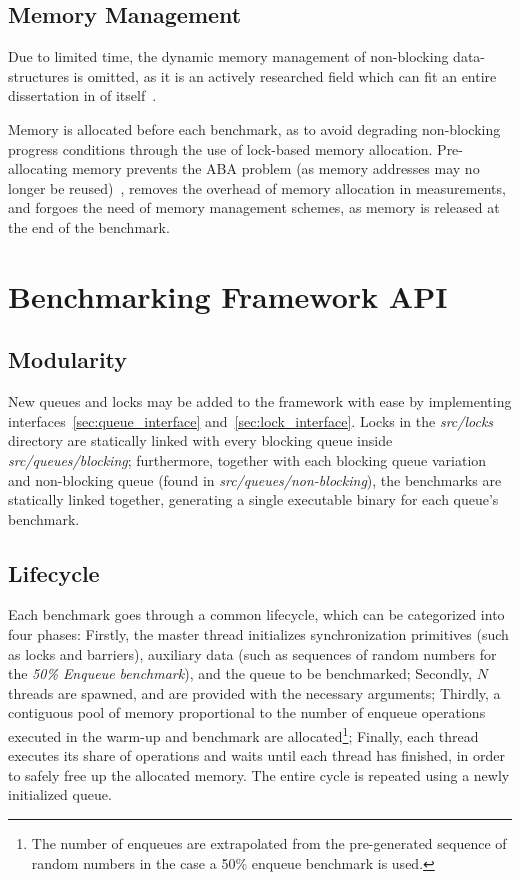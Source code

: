 \subsection{Memory Management}
Due to limited time, the dynamic memory management of non-blocking
data-structures is omitted, as it is an actively researched field which can fit
an entire dissertation in of itself~\citep{valois1995datastructures,michael2004hazard}.

Memory is allocated before each benchmark, as to avoid degrading
non-blocking progress conditions through the use of lock-based memory
allocation. Pre-allocating memory prevents the ABA problem (as memory addresses
may no longer be reused)~\citep{dechev2010understanding}, removes the overhead
of memory allocation in measurements, and forgoes the need of memory management
schemes, as memory is released at the end of the benchmark.

\section{Benchmarking Framework API}
\subsection{Modularity}
New queues and locks may be added to the framework with ease by implementing
interfaces~\ref{sec:queue_interface} and~\ref{sec:lock_interface}. Locks in the
\emph{src/locks} directory are statically linked with every blocking queue
inside \emph{src/queues/blocking}; furthermore, together with each blocking
queue variation and non-blocking queue (found in
\emph{src/queues/non-blocking}), the benchmarks are statically linked together,
generating a single executable binary for each queue's benchmark. 
\subsection{Lifecycle}
Each benchmark goes through a common lifecycle, which can be categorized into
four phases: 
Firstly, the master thread initializes synchronization primitives
(such as locks and barriers), auxiliary data (such as
sequences of random numbers for the \emph{50\% Enqueue benchmark}), and the
queue to be benchmarked; 
Secondly, $N$ threads are spawned, and are provided
with the necessary arguments;
Thirdly, a contiguous pool of memory proportional
to the number of enqueue operations executed in the warm-up and benchmark are
allocated\footnote{The number of enqueues are extrapolated from the
pre-generated sequence of random numbers in the case a 50\% enqueue benchmark
is used.};
Finally, each thread executes its share of operations and waits until each
thread has finished, in order to safely free up the allocated memory. The
entire cycle is repeated using a newly initialized queue.


